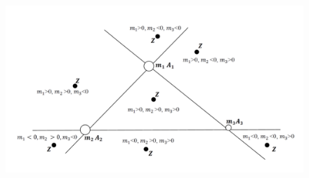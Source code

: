 \documentclass[a4paper,12pt]{article}
\theoremstyle{plain} %
\numberwithin{equation}{section}
\theoremstyle{definition} %
\theoremstyle{remark} %
\begin{document}
\begin{figure} 
\vspace{-0.5ex}
\includegraphics[width=\linewidth]{img/координаты.png}
\label{fig:somelabel}
\end{figure}
\end{document}
